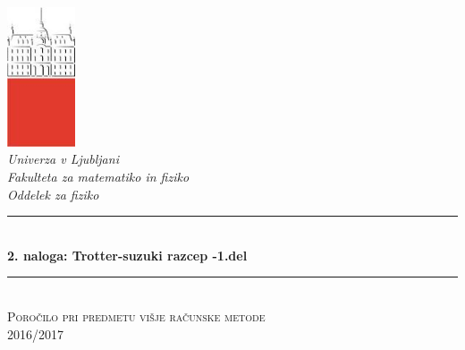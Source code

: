 \documentclass[slovene,11pt,a4paper]{article}
\numberwithin{equation}{section} %
\numberwithin{figure}{section} %
\numberwithin{table}{section} %
\begin{document}
\begin{titlepage}

\newcommand{\HRule}{\rule{\linewidth}{0.5mm}} %

\center %


 

\includegraphics[width=2cm]{slike/aaa}\\[0.5cm]
 
\textit{Univerza v Ljubljani}\\
\textit{Fakulteta za {\color{red}matematiko in fiziko}}\\[0.5cm]

\emph{Oddelek za fiziko}\\[0.5cm] %


\HRule \\[0.4cm]
\huge {\bfseries 2. naloga: Trotter-suzuki razcep -1.del}\\[0.4cm] %
\HRule \\[0.5cm] 

 \textsc{\large Poročilo pri predmetu višje računske metode}\\
 \textsc{\large 2016/2017}\\[1cm] %
 

\end{titlepage}
\end{document}
